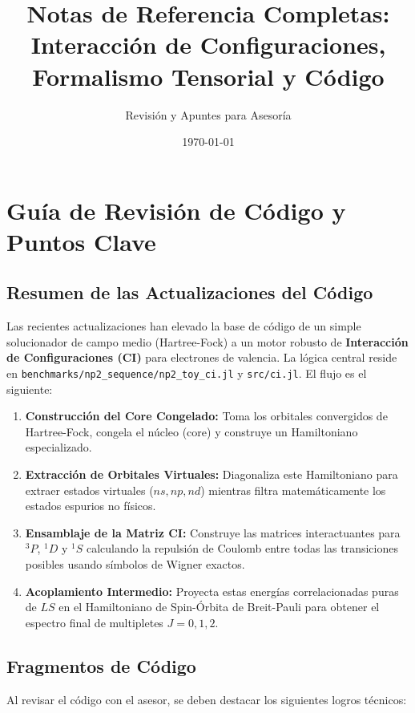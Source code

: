 \documentclass[11pt,a4paper]{article}
\title{Notas de Referencia Completas: Interacción de Configuraciones, Formalismo Tensorial y Código}
\author{Revisión y Apuntes para Asesoría}
\date{\today}
\begin{document}
\maketitle

\tableofcontents
\newpage

\section{Guía de Revisión de Código y Puntos Clave}

\subsection{Resumen de las Actualizaciones del Código}
Las recientes actualizaciones han elevado la base de código de un simple solucionador de campo medio (Hartree-Fock) a un motor robusto de \textbf{Interacción de Configuraciones (CI)} para electrones de valencia.
La lógica central reside en \texttt{benchmarks/np2\_sequence/np2\_toy\_ci.jl} y \texttt{src/ci.jl}. El flujo es el siguiente:
\begin{enumerate}
    \item \textbf{Construcción del Core Congelado:} Toma los orbitales convergidos de Hartree-Fock, congela el núcleo (core) y construye un Hamiltoniano especializado.
    \item \textbf{Extracción de Orbitales Virtuales:} Diagonaliza este Hamiltoniano para extraer estados virtuales ($ns, np, nd$) mientras filtra matemáticamente los estados espurios no físicos.
    \item \textbf{Ensamblaje de la Matriz CI:} Construye las matrices interactuantes para $^3P$, $^1D$ y $^1S$ calculando la repulsión de Coulomb entre todas las transiciones posibles usando símbolos de Wigner exactos.
    \item \textbf{Acoplamiento Intermedio:} Proyecta estas energías correlacionadas puras de $LS$ en el Hamiltoniano de Spin-Órbita de Breit-Pauli para obtener el espectro final de multipletes $J=0, 1, 2$.
\end{enumerate}

\subsection{Fragmentos de Código}
Al revisar el código con el asesor, se deben destacar los siguientes logros técnicos:
\end{document}
